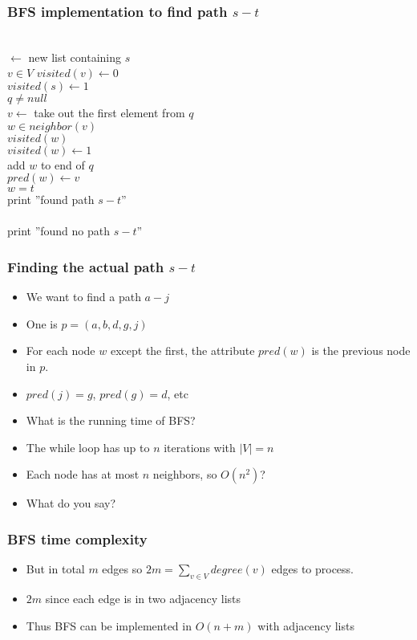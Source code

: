 \documentclass[trans]{beamer}
\begin{document}
\begin{frame}
\frametitle{BFS implementation to find path $s-t$}
\begin{tabbing}
\ahdr
\PROC {}					\\
\> $\leftarrow$ new list containing $s$		\\
\>\FOR $v \in V$ $visited(v) \leftarrow 0$	\\
\>$visited(s) \leftarrow 1$				\\
\>\WHILE $q \ne null$					\\
\>\>$v \leftarrow$ take out the first element from $q$	\\
\>\>\FOR $w \in neighbor(v)$ 				\\
\>\>\>\IF \NOT $visited(w)$ \THEN			\\
\>\>\>\>$visited(w) \leftarrow 1$			\\
\>\>\>\>add $w$ to end of $q$				\\
\>\>\>\>$pred(w) \leftarrow v$				\\
\>\>\>\>\IF $w = t$ \THEN				\\
\>\>\>\>\>print ''found path $s-t$''			\\
\>\>\>\>\>\RETURN 					\\
\>print ''found no path $s-t$''				
\end{tabbing}

\end{frame}

\begin{frame}
\frametitle{Finding the actual path $s-t$}
\begin{itemize}
\item We want to find a path $a-j$
\item One is $p = (a, b, d, g, j)$
\item For each node $w$ except the first, the attribute $pred(w)$ is the
previous node in $p$.
\item $pred(j) = g$, $pred(g) = d$, etc
\item What is the running time of BFS?
\item The while loop has up to $n$ iterations with $|V| = n$
\item Each node has at most $n$ neighbors, so $O(n^2)$?
\item What do you say?
\end{itemize}
\end{frame}

\begin{frame}
\frametitle{BFS time complexity}
\begin{itemize}
\item But in total $m$ edges so $2m = \sum_{v \in V}{degree(v)}$ edges to process.
\item $2m$ since each edge is in two adjacency lists
\item Thus BFS can be implemented in $O(n+m)$ with adjacency lists
\end{itemize}
\end{frame}
\end{document}
